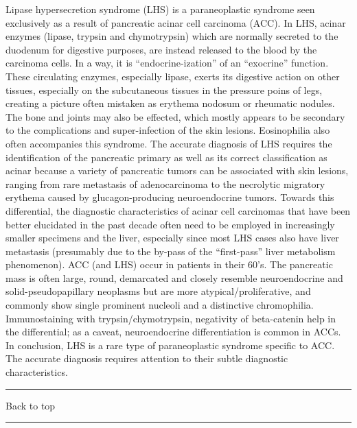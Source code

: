 \documentclass[]{article}
\begin{document}
Lipase hypersecretion syndrome (LHS) is a paraneoplastic syndrome seen
exclusively as a result of pancreatic acinar cell carcinoma (ACC). In
LHS, acinar enzymes (lipase, trypsin and chymotrypsin) which are
normally secreted to the duodenum for digestive purposes, are instead
released to the blood by the carcinoma cells. In a way, it is
``endocrine-ization'' of an ``exocrine'' function. These circulating
enzymes, especially lipase, exerts its digestive action on other
tissues, especially on the subcutaneous tissues in the pressure poins of
legs, creating a picture often mistaken as erythema nodosum or rheumatic
nodules. The bone and joints may also be effected, which mostly appears
to be secondary to the complications and super-infection of the skin
lesions. Eosinophilia also often accompanies this syndrome. The accurate
diagnosis of LHS requires the identification of the pancreatic primary
as well as its correct classification as acinar because a variety of
pancreatic tumors can be associated with skin lesions, ranging from rare
metastasis of adenocarcinoma to the necrolytic migratory erythema caused
by glucagon-producing neuroendocrine tumors. Towards this differential,
the diagnostic characteristics of acinar cell carcinomas that have been
better elucidated in the past decade often need to be employed in
increasingly smaller specimens and the liver, especially since most LHS
cases also have liver metastasis (presumably due to the by-pass of the
``first-pass'' liver metabolism phenomenon). ACC (and LHS) occur in
patients in their 60's. The pancreatic mass is often large, round,
demarcated and closely resemble neuroendocrine and solid-pseudopapillary
neoplasms but are more atypical/proliferative, and commonly show single
prominent nucleoli and a distinctive chromophilia. Immunostaining with
trypsin/chymotrypsin, negativity of beta-catenin help in the
differential; as a caveat, neuroendocrine differentiation is common in
ACCs. In conclusion, LHS is a rare type of paraneoplastic syndrome
specific to ACC. The accurate diagnosis requires attention to their
subtle diagnostic characteristics.

{}

{}

\begin{center}\rule{0.5\linewidth}{\linethickness}\end{center}

Back to top

\begin{center}\rule{0.5\linewidth}{\linethickness}\end{center}
\end{document}
